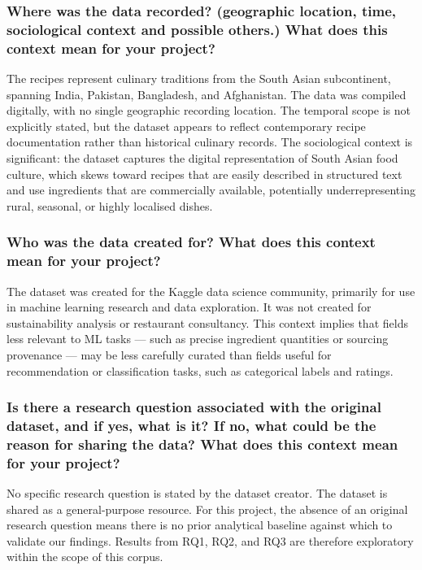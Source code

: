 \documentclass{article}
\newcommand{\question}[1]{#1}
\begin{document}
\question{\subsubsection*{Where was the data recorded? (geographic location, time, sociological context and possible others.) What does this context mean for your project?}}

The recipes represent culinary traditions from the South Asian subcontinent, spanning India, Pakistan, Bangladesh, and Afghanistan. The data was compiled digitally, with no single geographic recording location. The temporal scope is not explicitly stated, but the dataset appears to reflect contemporary recipe documentation rather than historical culinary records. The sociological context is significant: the dataset captures the digital representation of South Asian food culture, which skews toward recipes that are easily described in structured text and use ingredients that are commercially available, potentially underrepresenting rural, seasonal, or highly localised dishes.

\question{\subsubsection*{Who was the data created for? What does this context mean for your project?}}

The dataset was created for the Kaggle data science community, primarily for use in machine learning research and data exploration. It was not created for sustainability analysis or restaurant consultancy. This context implies that fields less relevant to ML tasks --- such as precise ingredient quantities or sourcing provenance --- may be less carefully curated than fields useful for recommendation or classification tasks, such as categorical labels and ratings.

\question{\subsubsection*{Is there a research question associated with the original dataset, and if yes, what is it? If no, what could be the reason for sharing the data? What does this context mean for your project?}}

No specific research question is stated by the dataset creator. The dataset is shared as a general-purpose resource. For this project, the absence of an original research question means there is no prior analytical baseline against which to validate our findings. Results from RQ1, RQ2, and RQ3 are therefore exploratory within the scope of this corpus.
\end{document}
